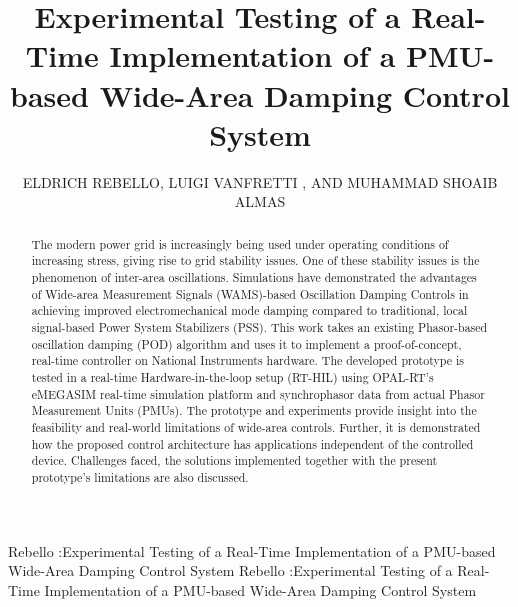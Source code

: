 \documentclass{ieeeaccess}
\begin{document}

\title{Experimental Testing of a Real-Time Implementation of a PMU-based Wide-Area Damping Control System}
\author{\uppercase{Eldrich Rebello},
\uppercase{Luigi Vanfretti  , and Muhammad Shoaib Almas
}
}
\address[1]{KTH Royal Institute of Technology, Stockholm, Sweden SE-100 44 (e-mail: eldrich.rebello@alumni.aalto.fi)}
\address[2]{Rensselaer Polytechnic Institute, 110 Eighth Street
Troy, NY USA 12180  (e-mail: vanfrl@rpi.edu)}
\address[3]{KTH Royal Institute of Technology, Stockholm, Sweden SE-100 44 (email: msalmas@kth.se)}

\markboth
{Rebello \headeretal:Experimental Testing of a Real-Time Implementation of a PMU-based Wide-Area Damping Control System}
{Rebello \headeretal:Experimental Testing of a Real-Time Implementation of a PMU-based Wide-Area Damping Control System}


\begin{abstract}
The modern power grid is increasingly being used under operating conditions of increasing stress, giving rise to grid stability issues. One of these stability issues is the phenomenon of inter-area oscillations. Simulations have demonstrated the advantages of Wide-area Measurement Signals (WAMS)-based Oscillation Damping Controls in achieving improved electromechanical mode damping compared to traditional, local signal-based Power System Stabilizers (PSS). This work takes an existing Phasor-based oscillation damping (POD) algorithm and uses it to implement a proof-of-concept, real-time controller on National Instruments hardware. The developed prototype is tested in a real-time Hardware-in-the-loop setup (RT-HIL) using OPAL-RT's eMEGASIM real-time simulation platform and synchrophasor data from actual Phasor Measurement Units (PMUs). The prototype and experiments provide insight into the feasibility and real-world limitations of wide-area controls. Further, it is demonstrated how the proposed control architecture has applications independent of the controlled device. Challenges faced, the solutions implemented together with the present prototype's limitations are also discussed.
\end{abstract}
\end{document}
